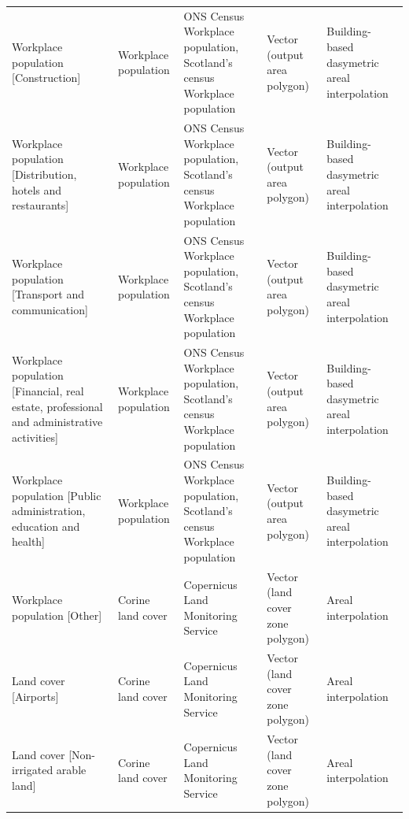 \documentclass[fleqn,10pt]{wlscirep}
\begin{document}
\begin{longtable}{p{}p{}p{}p{}p{}}
                                                                    Workplace population [Construction] &               Workplace population  &    ONS Census Workplace population, Scotland's census Workplace population  &      Vector (output area polygon)  &  Building-based dasymetric areal interpolation  \\
                                            Workplace population [Distribution, hotels and restaurants] &               Workplace population  &    ONS Census Workplace population, Scotland's census Workplace population  &      Vector (output area polygon)  &  Building-based dasymetric areal interpolation  \\
                                                        Workplace population [Transport and communication] &               Workplace population  &    ONS Census Workplace population, Scotland's census Workplace population  &      Vector (output area polygon)  &  Building-based dasymetric areal interpolation  \\
                Workplace population [Financial, real estate, professional and administrative activities] &               Workplace population  &    ONS Census Workplace population, Scotland's census Workplace population  &      Vector (output area polygon)  &  Building-based dasymetric areal interpolation  \\
                                        Workplace population [Public administration, education and health] &               Workplace population  &    ONS Census Workplace population, Scotland's census Workplace population  &      Vector (output area polygon)  &  Building-based dasymetric areal interpolation  \\
                                                                            Workplace population [Other] &                  Corine land cover  &                                         Copernicus Land Monitoring Service  &  Vector (land cover zone polygon)  &                            Areal interpolation  \\
                                                                                    Land cover [Airports] &                  Corine land cover  &                                         Copernicus Land Monitoring Service  &  Vector (land cover zone polygon)  &                            Areal interpolation  \\
                                                                    Land cover [Non-irrigated arable land] &                  Corine land cover  &                                         Copernicus Land Monitoring Service  &  Vector (land cover zone polygon)  &                            Areal interpolation  \\

\end{longtable}
\end{document}
